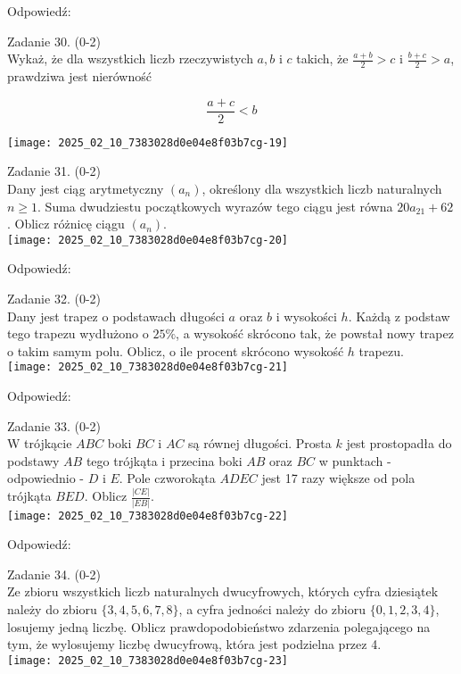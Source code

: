 \documentclass[10pt]{article}
\begin{document}
Odpowiedź:

Zadanie 30. (0-2)\\
Wykaż, że dla wszystkich liczb rzeczywistych \(a, b\) i \(c\) takich, że \(\frac{a+b}{2}>c\) i \(\frac{b+c}{2}>a\), prawdziwa jest nierówność

\[
\frac{a+c}{2}<b
\]

\begin{center}
\texttt{[image: 2025\_02\_10\_7383028d0e04e8f03b7cg-19]}
\end{center}

Zadanie 31. (0-2)\\
Dany jest ciąg arytmetyczny \(\left(a_{n}\right)\), określony dla wszystkich liczb naturalnych \(n \geq 1\). Suma dwudziestu początkowych wyrazów tego ciągu jest równa \(20 a_{21}+62\). Oblicz różnicę ciągu \(\left(a_{n}\right)\).\\
\texttt{[image: 2025\_02\_10\_7383028d0e04e8f03b7cg-20]}

Odpowiedź:

Zadanie 32. (0-2)\\
Dany jest trapez o podstawach długości \(a\) oraz \(b\) i wysokości \(h\). Każdą z podstaw tego trapezu wydłużono o \(25 \%\), a wysokość skrócono tak, że powstał nowy trapez o takim samym polu. Oblicz, o ile procent skrócono wysokość \(h\) trapezu.\\
\texttt{[image: 2025\_02\_10\_7383028d0e04e8f03b7cg-21]}

Odpowiedź:

Zadanie 33. (0-2)\\
W trójkącie \(A B C\) boki \(B C\) i \(A C\) są równej długości. Prosta \(k\) jest prostopadła do podstawy \(A B\) tego trójkąta i przecina boki \(A B\) oraz \(B C\) w punktach - odpowiednio - \(D\) i \(E\). Pole czworokąta \(A D E C\) jest 17 razy większe od pola trójkąta \(B E D\). Oblicz \(\frac{|C E|}{|E B|}\).\\
\texttt{[image: 2025\_02\_10\_7383028d0e04e8f03b7cg-22]}

Odpowiedź:

Zadanie 34. (0-2)\\
Ze zbioru wszystkich liczb naturalnych dwucyfrowych, których cyfra dziesiątek należy do zbioru \(\{3,4,5,6,7,8\}\), a cyfra jedności należy do zbioru \(\{0,1,2,3,4\}\), losujemy jedną liczbę. Oblicz prawdopodobieństwo zdarzenia polegającego na tym, że wylosujemy liczbę dwucyfrową, która jest podzielna przez 4.\\
\texttt{[image: 2025\_02\_10\_7383028d0e04e8f03b7cg-23]}
\end{document}
